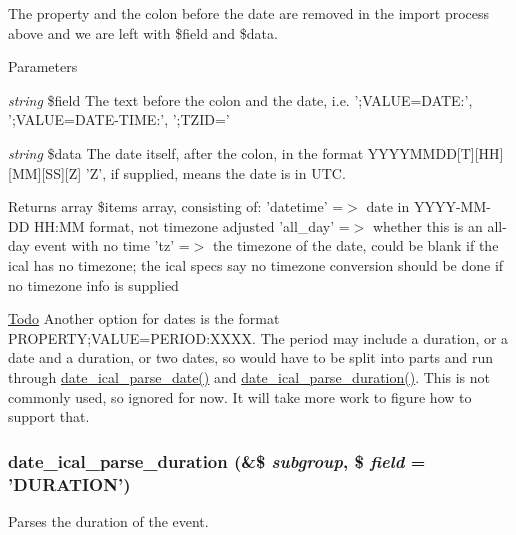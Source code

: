 The property and the colon before the date are removed in the import process above and we are left with \$field and \$data.


\begin{DoxyParams}{Parameters}
\item[{\em string}]\$field The text before the colon and the date, i.e. ';VALUE=DATE:', ';VALUE=DATE-\/TIME:', ';TZID=' \item[{\em string}]\$data The date itself, after the colon, in the format YYYYMMDD\mbox{[}T\mbox{]}\mbox{[}HH\mbox{]}\mbox{[}MM\mbox{]}\mbox{[}SS\mbox{]}\mbox{[}Z\mbox{]} 'Z', if supplied, means the date is in UTC.\end{DoxyParams}
\begin{DoxyReturn}{Returns}
array \$items array, consisting of: 'datetime' =$>$ date in YYYY-\/MM-\/DD HH:MM format, not timezone adjusted 'all\_\-day' =$>$ whether this is an all-\/day event with no time 'tz' =$>$ the timezone of the date, could be blank if the ical has no timezone; the ical specs say no timezone conversion should be done if no timezone info is supplied 
\end{DoxyReturn}
\begin{Desc}
\item[\hyperlink{todo__todo000050}{Todo}]Another option for dates is the format PROPERTY;VALUE=PERIOD:XXXX. The period may include a duration, or a date and a duration, or two dates, so would have to be split into parts and run through \hyperlink{date__api__ical_8inc_a043a6a7b1c9724a27cd16750f01492c4}{date\_\-ical\_\-parse\_\-date()} and \hyperlink{date__api__ical_8inc_a8a63c8aa2158e701b01217637169440d}{date\_\-ical\_\-parse\_\-duration()}. This is not commonly used, so ignored for now. It will take more work to figure how to support that. \end{Desc}
\hypertarget{date__api__ical_8inc_a8a63c8aa2158e701b01217637169440d}{
\subsubsection[{date\_\-ical\_\-parse\_\-duration}]{\setlength{\rightskip}{0pt plus 5cm}date\_\-ical\_\-parse\_\-duration (\&\$ {\em subgroup}, \/  \$ {\em field} = {\ttfamily 'DURATION'})}}
\label{date__api__ical_8inc_a8a63c8aa2158e701b01217637169440d}
Parses the duration of the event.

